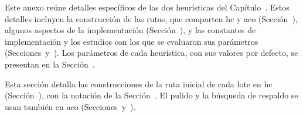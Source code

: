 \startchapter[title={Detalles de las heurísticas}, reference=Anexo_Metaheuristicas]

Este anexo reúne detalles específicos de las dos heurísticas del
Capítulo~\in[Capitulo_4]. Estos detalles incluyen la construcción de las rutas, que comparten \ac{hc} y \ac{aco}
(Sección~), algunos aspectos de la implementación
(Sección~), y las constantes de implementación y los
estudios con los que se evaluaron sus parámetros
(Secciones~ y~). Los parámetros de
cada heurística, con sus valores por defecto, se presentan en la
Sección~.

\startsection[title={Construcción de las rutas}, reference=sec:anexo_rutas]

Esta sección detalla las construcciones de la ruta inicial de cada lote en
\ac{hc} (Sección~), con la notación de la
Sección~. El pulido y la búsqueda de respaldo se usan también en \ac{aco}
(Secciones~ y~).

\startsubsection[title={Construcciones candidatas}, reference=sec:anexo_rutas_construcciones]

